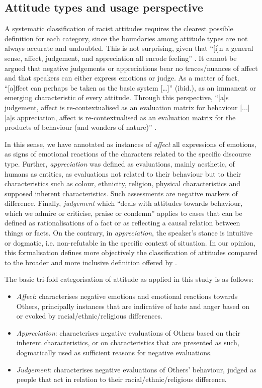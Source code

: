 \documentclass[output=paper]{LSP/langsci}
\begin{document}
\subsection{Attitude types and usage perspective} \label{sec:2:4:2}

A systematic classification of racist attitudes requires the clearest possible definition for each category, since the boundaries among attitude types are not always accurate and undoubted. This is not surprising, given that “[i]n a general sense, affect, judgement, and appreciation all encode feeling” \citep[147]{Martin2000}. It cannot be argued that negative judgements or appreciations bear no traces/nuances of affect and that speakers can either express emotions or judge. As a matter of fact, “[a]ffect can perhaps be taken as the basic system […]” (ibid.), as an immanent or emerging characteristic of every attitude. Through this perspective, “[a]s judgement, affect is re-contextualised as an evaluation matrix for behaviour [...] [a]s appreciation, affect is re-contextualised as an evaluation matrix for the products of behaviour (and wonders of nature)” \citep[147]{Martin2000}.

In this sense, we have annotated as instances of \textit{affect} all expressions of emotions, as signs of emotional reactions of the characters related to the specific discourse type. Further, \textit{appreciation} was defined as evaluations, mainly aesthetic, of humans as entities, as evaluations not related to their behaviour but to their characteristics such as colour, ethnicity, religion, physical characteristics and supposed inherent characteristics. Such assessments are negative markers of difference. Finally, \textit{judgement} which “deals with attitudes towards behaviour, which we admire or criticise, praise or condemn” \citep[42]{MartinWhite2005} applies to cases that can be defined as rationalisations of a fact or as reflecting a causal relation between things or facts. On the contrary, in \textit{appreciation}, the speaker's stance is intuitive or dogmatic, i.e. non-refutable in the specific context of situation. In our opinion, this formalisation defines more objectively the classification of attitudes compared to the broader and more inclusive definition offered by \citet[42-45]{MartinWhite2005}.

The basic tri-fold categorisation of attitude as applied in this study is as follows:

\begin{itemize}
\item \textit{Affect}: characterises negative emotions and emotional reactions towards Others, principally instances that are indicative of hate and anger based on or evoked by racial/ethnic/religious differences.
\item \textit{Appreciation}: characterises negative evaluations of Others based on their inherent characteristics, or on characteristics that are presented as such, dogmatically used as sufficient reasons for negative evaluations.
\item \textit{Judgement}: characterises negative evaluations of Others' behaviour, judged as people that act in relation to their racial/ethnic/religious difference.
\end{itemize}
\end{document}
